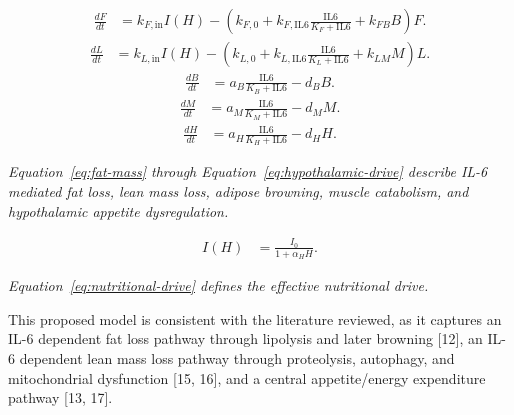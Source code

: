 \documentclass[11pt]{article}
\begin{document}
\begin{equation}
\begin{aligned}
\frac{dF}{dt} &= k_{F,\mathrm{in}}I(H)-\left(k_{F,0}+k_{F,\mathrm{IL6}}\frac{\mathrm{IL6}}{K_F+\mathrm{IL6}}+k_{FB}B\right)F.
\end{aligned}
\label{eq:fat-mass}
\end{equation}
\begin{equation}
\begin{aligned}
\frac{dL}{dt} &= k_{L,\mathrm{in}}I(H)-\left(k_{L,0}+k_{L,\mathrm{IL6}}\frac{\mathrm{IL6}}{K_L+\mathrm{IL6}}+k_{LM}M\right)L.
\end{aligned}
\label{eq:lean-mass}
\end{equation}
\begin{equation}
\begin{aligned}
\frac{dB}{dt} &= a_B\frac{\mathrm{IL6}}{K_B+\mathrm{IL6}}-d_BB.
\end{aligned}
\label{eq:browning}
\end{equation}
\begin{equation}
\begin{aligned}
\frac{dM}{dt} &= a_M\frac{\mathrm{IL6}}{K_M+\mathrm{IL6}}-d_MM.
\end{aligned}
\label{eq:muscle-catabolism}
\end{equation}
\begin{equation}
\begin{aligned}
\frac{dH}{dt} &= a_H\frac{\mathrm{IL6}}{K_H+\mathrm{IL6}}-d_HH.
\end{aligned}
\label{eq:hypothalamic-drive}
\end{equation}

\emph{Equation~\ref{eq:fat-mass} through Equation~\ref{eq:hypothalamic-drive} describe IL-6 mediated fat loss, lean mass loss, adipose browning, muscle catabolism, and hypothalamic appetite dysregulation.}
\par\medskip


\begin{equation}
\begin{aligned}
I(H) &= \frac{I_0}{1+\alpha_H H}.
\end{aligned}
\label{eq:nutritional-drive}
\end{equation}

\emph{Equation~\ref{eq:nutritional-drive} defines the effective nutritional drive.}
\par\medskip

This proposed model is consistent with the literature reviewed, as it captures an IL-6 dependent fat loss pathway through lipolysis and later browning [12], an IL-6 dependent lean mass loss pathway through proteolysis, autophagy, and mitochondrial dysfunction [15, 16], and a central appetite/energy expenditure pathway [13, 17].
\par\medskip
\end{document}
